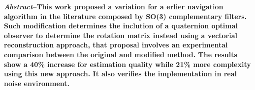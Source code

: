 \documentclass[conference]{IEEEtran}
\begin{document}
\maketitle
\textbf{\small \emph{Abstract}--This work proposed a variation for a erlier navigation algorithm in the literature composed by SO(3) complementary filters. Such modification determines the inclution of a quaternion optimal observer to determine  the rotation matrix instead using a vectorial reconstruction approach, that proposal involves an experimental comparison between the original and modified method. The results show a 40\% increase for estimation quality while 21\% more complexity using this new approach. It also verifies the implementation in real noise environment.\\[3mm]}





%
\IEEEpeerreviewmaketitle
\end{document}
